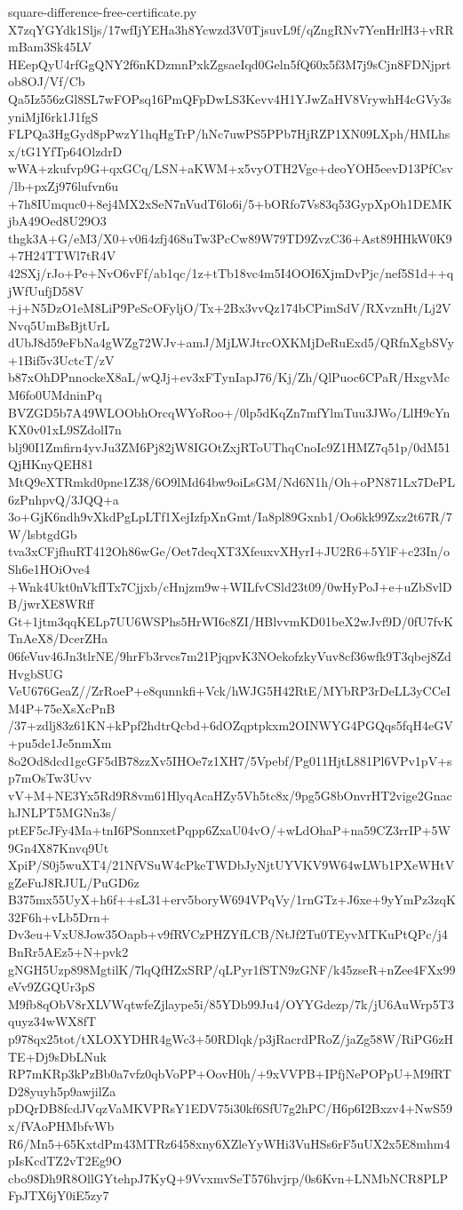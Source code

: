 \documentclass[11pt]{article}
\theoremstyle{definition}
\theoremstyle{remark}
\begin{document}
\begin{filecontents*}[overwrite]{square-difference-free-certificate.py}
X7zqYGYdk1Sljs/17wfIjYEHa3h8Ycwzd3V0TjsuvL9f/qZngRNv7YenHrlH3+vRRmBam3Sk45LV
HEepQyU4rfGgQNY2f6nKDzmnPxkZgsaeIqd0Geln5fQ60x5f3M7j9sCjn8FDNjprtob8OJ/Vf/Cb
Qa5Iz556zGl8SL7wFOPsq16PmQFpDwLS3Kevv4H1YJwZaHV8VrywhH4cGVy3syniMjI6rk1J1fgS
FLPQa3HgGyd8pPwzY1hqHgTrP/hNc7uwPS5PPb7HjRZP1XN09LXph/HMLhsx/tG1YfTp64OlzdrD
wWA+zkufvp9G+qxGCq/LSN+aKWM+x5vyOTH2Vge+deoYOH5eevD13PfCsv/lb+pxZj976lufvn6u
+7h8IUmquc0+8ej4MX2xSeN7nVudT6lo6i/5+bORfo7Vs83q53GypXpOh1DEMKjbA49Oed8U29O3
thgk3A+G/eM3/X0+v0fi4zfj468uTw3PcCw89W79TD9ZvzC36+Ast89HHkW0K9+7H24TTWl7tR4V
42SXj/rJo+Pe+NvO6vFf/ab1qc/1z+tTb18vc4m5I4OOI6XjmDvPjc/nef5S1d++qjWfUufjD58V
+j+N5DzO1eM8LiP9PeScOFyljO/Tx+2Bx3vvQz174bCPimSdV/RXvznHt/Lj2VNvq5UmBsBjtUrL
dUbJ8d59eFbNa4gWZg72WJv+amJ/MjLWJtrcOXKMjDeRuExd5/QRfnXgbSVy+1Bif5v3UctcT/zV
b87xOhDPnnockeX8aL/wQJj+ev3xFTynIapJ76/Kj/Zh/QlPuoc6CPaR/HxgvMcM6fo0UMdninPq
BVZGD5b7A49WLOObhOrcqWYoRoo+/0lp5dKqZn7mfYlmTuu3JWo/LlH9cYnKX0v01xL9SZdolI7n
blj90I1Zmfirn4yvJu3ZM6Pj82jW8IGOtZxjRToUThqCnoIc9Z1HMZ7q51p/0dM51QjHKnyQEH81
MtQ9eXTRmkd0pne1Z38/6O9lMd64bw9oiLsGM/Nd6N1h/Oh+oPN871Lx7DePL6zPnhpvQ/3JQQ+a
3o+GjK6ndh9vXkdPgLpLTf1XejIzfpXnGmt/Ia8pl89Gxnb1/Oo6kk99Zxz2t67R/7W/lsbtgdGb
tva3xCFjfhuRT412Oh86wGe/Oet7deqXT3XfeuxvXHyrI+JU2R6+5YlF+c23In/oSh6e1HOiOve4
+Wnk4Ukt0nVkfITx7Cjjxb/cHnjzm9w+WILfvCSld23t09/0wHyPoJ+e+uZbSvlDB/jwrXE8WRff
Gt+1jtm3qqKELp7UU6WSPhs5HrWI6c8ZI/HBlvvmKD01beX2wJvf9D/0fU7fvKTnAeX8/DcerZHa
06feVuv46Jn3tlrNE/9hrFb3rvcs7m21PjqpvK3NOekofzkyVuv8cf36wfk9T3qbej8ZdHvgbSUG
VeU676GeaZ//ZrRoeP+e8qunnkfi+Vck/hWJG5H42RtE/MYbRP3rDeLL3yCCeIM4P+75eXsXcPnB
/37+zdlj83z61KN+kPpf2hdtrQcbd+6dOZqptpkxm2OINWYG4PGQqs5fqH4eGV+pu5de1Je5nmXm
8o2Od8dcd1gcGF5dB78zzXv5IHOe7z1XH7/5Vpebf/Pg011HjtL881Pl6VPv1pV+sp7mOsTw3Uvv
vV+M+NE3Yx5Rd9R8vm61HlyqAcaHZy5Vh5tc8x/9pg5G8bOnvrHT2vige2GnachJNLPT5MGNn3s/
ptEF5cJFy4Ma+tnI6PSonnxetPqpp6ZxaU04vO/+wLdOhaP+na59CZ3rrIP+5W9Gn4X87Knvq9Ut
XpiP/S0j5wuXT4/21NfVSuW4cPkeTWDbJyNjtUYVKV9W64wLWb1PXeWHtVgZeFuJ8RJUL/PuGD6z
B375mx55UyX+h6f++sL31+erv5boryW694VPqVy/1rnGTz+J6xe+9yYmPz3zqK32F6h+vLb5Drn+
Dv3eu+VxU8Jow35Oapb+v9fRVCzPHZYfLCB/NtJf2Tu0TEyvMTKuPtQPc/j4BnRr5AEz5+N+pvk2
gNGH5Uzp898MgtilK/7lqQfHZxSRP/qLPyr1fSTN9zGNF/k45zseR+nZee4FXx99eVv9ZGQUr3pS
M9fb8qObV8rXLVWqtwfeZjlaype5i/85YDb99Ju4/OYYGdezp/7k/jU6AuWrp5T3quyz34wWX8fT
p978qx25tot/tXLOXYDHR4gWc3+50RDlqk/p3jRacrdPRoZ/jaZg58W/RiPG6zHTE+Dj9sDbLNuk
RP7mKRp3kPzBb0a7vfz0qbVoPP+OovH0h/+9xVVPB+IPfjNePOPpU+M9fRTD28yuyh5p9awjilZa
pDQrDB8fcdJVqzVaMKVPRsY1EDV75i30kf6SfU7g2hPC/H6p6I2Bxzv4+NwS59x/fVAoPHMbfvWb
R6/Mn5+65KxtdPm43MTRz6458xny6XZleYyWHi3VuHSs6rF5uUX2x5E8mhm4pIsKcdTZ2vT2Eg9O
cbo98Dh9R8OllGYtehpJ7KyQ+9VvxmvSeT576hvjrp/0s6Kvn+LNMbNCR8PLPFpJTX6jY0iE5zy7

\end{filecontents*}
\end{document}
